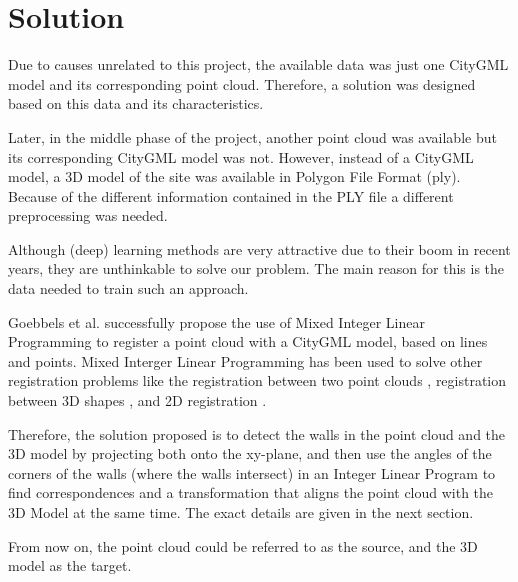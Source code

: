 

    \chapter{Solution}
    Due to causes unrelated to this project, the available data was just one CityGML model and its corresponding point cloud.
    Therefore, a solution was designed based on this data and its characteristics.

    Later, in the middle phase of the project, another point cloud was available but its corresponding CityGML model was not.
    However, instead of a CityGML model, a 3D model of the site was available in Polygon File Format (ply).
    Because of the different information contained in the PLY file a different preprocessing was needed.

    Although (deep) learning methods are very attractive due to their boom in recent years,
    they are unthinkable to solve our problem. The main reason for this is the data needed to train such an approach.

    Goebbels et al. \cite{Goebbels_2018_linebased, Goebbels_2018_alinear} successfully propose the use of Mixed Integer Linear Programming to register
    a point cloud with a CityGML model, based on lines and points.
    Mixed Interger Linear Programming has been used to solve other registration problems
    like the registration between two point clouds \cite{Sakakubara_2007_automatic},
    registration between 3D shapes \cite{Windheuser_2011_largescale},
    and 2D registration \cite{Bazin_2013_abranchandbound}.

    Therefore, the solution proposed is to detect the walls in the point cloud and the 3D model by projecting both onto the xy-plane,  
    and then use the angles of the corners of the walls (where the walls intersect)
    in an Integer Linear Program to find correspondences and a transformation that aligns the point cloud with the 3D Model at the same time.
    The exact details are given in the next section.

    From now on, the point cloud could be referred to as the source, and the 3D model as the target.
     

